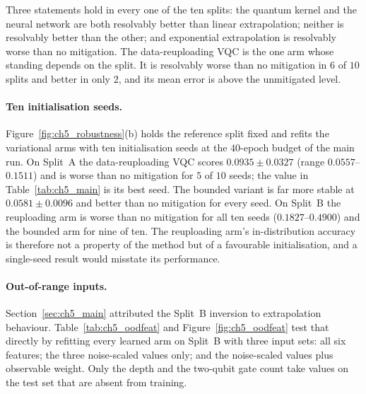 \documentclass[Thesis.tex]{subfiles}
\begin{document}
Three statements hold in every one of the ten splits: the quantum kernel and the
neural network are both resolvably better than linear extrapolation; neither is
resolvably better than the other; and exponential extrapolation is resolvably worse
than no mitigation. The data-reuploading VQC is the one arm whose standing depends on
the split. It is resolvably worse than no mitigation in $6$ of $10$ splits and better
in only $2$, and its mean error is above the unmitigated level.

\paragraph{Ten initialisation seeds.} Figure~\ref{fig:ch5_robustness}(b) holds the
reference split fixed and refits the variational arms with ten initialisation seeds
at the $40$-epoch budget of the main run. On Split~A the data-reuploading VQC scores
$0.0935 \pm 0.0327$ (range $0.0557$--$0.1511$) and is worse than no mitigation for
$5$ of $10$ seeds; the value in Table~\ref{tab:ch5_main} is its best seed. The
bounded variant is far more stable at $0.0581 \pm 0.0096$ and better than no
mitigation for every seed. On Split~B the reuploading arm is worse than no
mitigation for all ten seeds ($0.1827$--$0.4900$) and the bounded arm for nine of
ten. The reuploading arm's in-distribution accuracy is therefore not a property of
the method but of a favourable initialisation, and a single-seed result would
misstate its performance.

\paragraph{Out-of-range inputs.} Section~\ref{sec:ch5_main} attributed the Split~B
inversion to extrapolation behaviour. Table~\ref{tab:ch5_oodfeat} and
Figure~\ref{fig:ch5_oodfeat} test that directly by refitting every learned arm on
Split~B with three input sets: all six features; the three noise-scaled values only;
and the noise-scaled values plus observable weight. Only the depth and the
two-qubit gate count take values on the test set that are absent from training.
\end{document}
